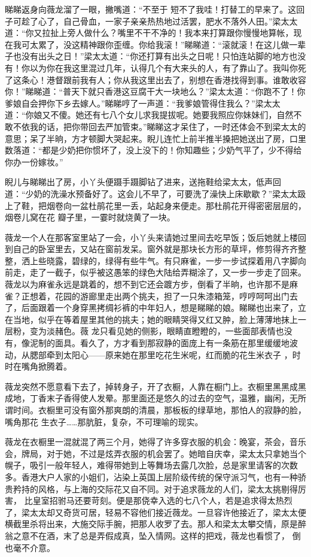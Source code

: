 \documentclass{article}
\begin{document}
睇睇返身向薇龙溜了一眼，撇嘴道：“不至于
\newpage
短不了我哇！打替工的早来了。这回子可趁了心了，自己骨血，一家子亲亲热热地过活罢，肥水不落外人田。”梁太太道：“你又拉扯上旁人做什么？嘴里不干不净的！我本来打算跟你慢慢地算帐，现在我可太累了，没这精神跟你歪缠。你给我滚！”睇睇道：“滚就滚！在这儿做一辈子也没有出头之日！”梁太太道：“你还打算有出头之日呢！只怕连站脚的地方也没有！你以为你在我这里混过几年，认得几个有大来头的人，有了靠山了。我叫你死了这条心！港督跟前我有人；你从我这里出去了，别想在香港找得到事。谁敢收容你！”睇睇道：“普天下就只香港这豆腐干大一块地么？”梁太太道：“你跑不了！你爹娘自会押你下乡去嫁人。”睇睇哼了一声道：“我爹娘管得住我么？”梁太太道：“你娘又不傻。她还有七八个女儿求我提拔呢。她要我照应你妹妹们，自然不敢不依我的话，把你带回去严加管束。”睇睇这才呆住了，一时还体会不到梁太太的意思；呆了半晌，方才顿脚大哭起来。睨儿连忙上前半推半搡把她送出了房，口里数落道：“都是少奶把你惯坏了，没上没下的！你知趣些；少奶气平了，少不得给你办一份嫁妆。”

\newpage
 

睨儿与睇睇出了房，小丫头便蹑手蹑脚钻了进来，送拖鞋给梁太太，低声回道：“少奶的洗澡水预备好了。这会儿不早了，可要洗了澡快上床歇歇？”梁太太趿上了鞋，把烟卷向一盆杜鹃花里一丢，站起身来便走。那杜鹃花开得密密层层的，烟卷儿窝在花
瓣子里，一霎时就烧黄了一块。 

薇龙一个人在那客室里站了一会，小丫头来请她过里间去吃早饭；饭后她就上楼回到自己的卧室里去，又站在窗前发呆。窗外就是那块长方形的草坪，修剪得齐齐整整，洒上些晓露，碧绿的，绿得有些牛气。有只麻雀，一步一步试探着用八字脚向前走，走了一截子，似乎被这愚笨的绿色大陆给弄糊涂了，又一步一步走了回来。薇龙以为麻雀永远是跳着的，想不到它还会踱方步，倒看了半晌，也许那不是麻雀？正想着，花园的游廊里走出两个挑夫，担了一只朱漆箱笼，哼哼呵呵出门去了，后面跟着一个身穿黑拷绸衫裤的中年妇人，想是睇睇的娘。睇睇也出来了，立在当地，似乎在等着屋里其他的挑夫；她的眼睛哭得又红又肿，脸上薄薄地抹上一层粉，变为淡赭色。薇
\newpage
龙只看见她的侧影，眼睛直瞪瞪的，一些面部表情也没有，像泥制的面具。看久了，方才看到那寂静的面庞上有一条筋在那里缓缓地波动，从腮部牵到太阳心——原来她在那里吃花生米呢，红而脆的花生米衣子
，时时在嘴角掀腾着。 

薇龙突然不愿意看下去了，掉转身子，开了衣橱，人靠在橱门上。衣橱里黑黑成黑成地，丁香末子香得使人发晕。那里面还是悠久的过去的空气，温雅，幽闲，无所谓时间。衣橱里可没有窗外那爽朗的清晨，那板板的绿草地，那怕人的寂静的脸，嘴角那花
生衣子……那肮脏，复杂，不可理喻的现实。 

薇龙在衣橱里一混就混了两三个月，她得了许多穿衣服的机会：晚宴，茶会，音乐会，牌局，对于她，不过是炫弄衣服的机会罢了。她暗自庆幸，梁太太只拿她当个幌子，吸引一般年轻人，难得带她到上等舞场去露几次脸，总是家里请客的次数多。香港大户人家的小姐们，沾染上英国上层阶级传统的保守派习气，也有一种骄贵矜持的风格，与上海的交际花又自不同。对于追求薇龙的人们，梁太太挑剔得厉害，
\newpage
比皇室招驸马还要苛刻。便是那侥幸入选的七八个人，若是追求得太热烈了，梁太太却又奇货可居，轻易不容他们接近薇龙。一旦容许他接近了，梁太太便横截里杀将出来，大施交际手腕，把那人收罗了去。那人和梁太太攀交情，原是醉翁之意不在酒，末了总是弄假成真，坠入情网。这样的把戏，薇龙也看惯了，
倒也毫不介意。 
\end{document}
